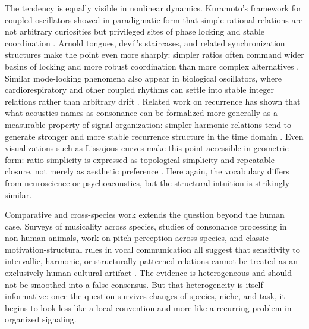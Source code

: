 The tendency is equally visible in nonlinear dynamics. Kuramoto's framework for coupled oscillators showed in paradigmatic form that simple rational relations are not arbitrary curiosities but privileged sites of phase locking and stable coordination \parencites{kuramoto_1984}{pikovsky_2001}. Arnold tongues, devil's staircases, and related synchronization structures make the point even more sharply: simpler ratios often command wider basins of locking and more robust coordination than more complex alternatives \parencite{strogatz_2000}. Similar mode-locking phenomena also appear in biological oscillators, where cardiorespiratory and other coupled rhythms can settle into stable integer relations rather than arbitrary drift \parencite{glass_1988}. Related work on recurrence has shown that what acoustics names as consonance can be formalized more generally as a measurable property of signal organization: simpler harmonic relations tend to generate stronger and more stable recurrence structure in the time domain \parencite{trulla_2018}. Even visualizations such as Lissajous curves make this point accessible in geometric form: ratio simplicity is expressed as topological simplicity and repeatable closure, not merely as aesthetic preference \parencite{gallozzi_2023}. Here again, the vocabulary differs from neuroscience or psychoacoustics, but the structural intuition is strikingly similar.

Comparative and cross-species work extends the question beyond the human case. Surveys of musicality across species, studies of consonance processing in non-human animals, work on pitch perception across species, and classic motivation-structural rules in vocal communication all suggest that sensitivity to intervallic, harmonic, or structurally patterned relations cannot be treated as an exclusively human cultural artifact \parencites{hoeschele_2015}{toro_2017}{walker_2019}{morton_1977}. The evidence is heterogeneous and should not be smoothed into a false consensus. But that heterogeneity is itself informative: once the question survives changes of species, niche, and task, it begins to look less like a local convention and more like a recurring problem in organized signaling.


